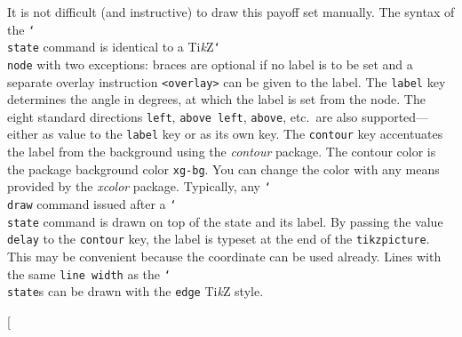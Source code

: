 \documentclass{article}
\makeatletter
\def\posskip{\vskip2pt plus 2pt minus 2pt}
\newcounter{fox}
\def\fox{\@ifstar\@fox\@@fox}
\def\@@fox{\@ifnextchar[{\fox@opt}{\fox@bgt}}
\renewcommand{\textbackslash}{\char`\\}
\def\cmd#1{\texttt{\color{cmd}\textbackslash#1}}
\def\TikZ{Ti\emph{k}Z\xspace}
\makeatother
\begin{document}
It is not difficult (and instructive) to draw this payoff set manually. The syntax of the \cmd{state} command is identical to a \TikZ \cmd{node} with two exceptions: braces are optional if no label is to be set and a separate overlay instruction \texttt{<overlay>} can be given to the label. The \texttt{label} key determines the angle in degrees, at which the label is set from the node. The eight standard directions \texttt{left}, \texttt{above left}, \texttt{above}, etc.~are also supported---either as value to the \texttt{label} key or as its own key. The \texttt{contour} key accentuates the label from the background using the \emph{contour} package. The contour color is the package background color \texttt{xg-bg}. You can change the color with any means provided by the \textit{xcolor} package. Typically, any \cmd{draw} command issued after a \cmd{state} command is drawn on top of the state and its label. By passing the value \texttt{delay} to the \texttt{contour} key, the label is typeset at the end of the \texttt{tikzpicture}. This may be convenient because the coordinate can be used already. 
%
%
Lines with the same \texttt{line width} as the \cmd{state}s can be drawn with the \texttt{edge} \TikZ style.\bigskip


\fox{\posskip
\begin{center}
\label{halfspace}
\end{center}\vspace{-2.4mm}
}
\end{document}
